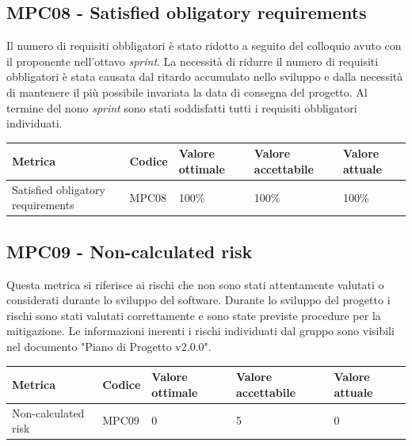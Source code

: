 \subsection{MPC08 - Satisfied obligatory requirements}
\label{s:mpc08}
Il numero di requisiti obbligatori è stato ridotto a seguito del colloquio avuto con il proponente nell'ottavo \textit{sprint}.
La necessità di ridurre il numero di requisiti obbligatori è stata causata dal ritardo accumulato nello sviluppo e dalla necessità di mantenere il più possibile invariata la data di consegna del progetto.
Al termine del nono \textit{sprint} sono stati soddisfatti tutti i requisiti obbligatori individuati.
\begin{table}[H]
    \centering
    \begin{tabularx}{\textwidth}{X|l|l|l|l}
        \hline
        \textbf{Metrica}                  & \textbf{Codice} & \textbf{Valore ottimale} & \textbf{Valore accettabile} & \textbf{Valore attuale} \\
        \hline
        Satisfied obligatory requirements & MPC08           & 100\%                    & 100\%                       & 100\%                   \\
        \hline
    \end{tabularx}
\end{table}


\subsection{MPC09 - Non-calculated risk}
\label{s:mpc09}
Questa metrica si riferisce ai rischi che non sono stati attentamente valutati o considerati durante lo sviluppo del software.
Durante lo sviluppo del progetto i rischi sono stati valutati correttamente e sono state previste procedure per la mitigazione.
Le informazioni inerenti i rischi individuati dal gruppo sono visibili nel documento "Piano di Progetto v2.0.0".
\begin{table}[H]
    \centering
    \begin{tabularx}{\textwidth}{X|l|l|l|l}
        \hline
        \textbf{Metrica}    & \textbf{Codice} & \textbf{Valore ottimale} & \textbf{Valore accettabile} & \textbf{Valore attuale} \\
        \hline
        Non-calculated risk & MPC09           & 0                        & 5                           & 0                       \\
        \hline
    \end{tabularx}
\end{table}


